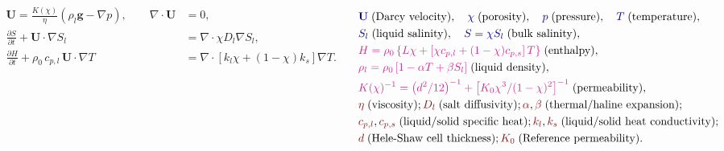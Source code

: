 \documentclass[landscape,24pt, a0paper,colspace=10mm,blockverticalspace=12mm]{tikzposter}
\newcommand{\varColor}[1]{\textcolor{dukeblue}{#1}}
\newcommand{\eqnColor}[1]{\textcolor{royalfuchsia}{#1}}
\newcommand{\paramColor}[1]{\textcolor{falured}{#1}}
\begin{document}
\begin{columns}
{\begin{minipage}[t]{0.49\linewidth}
\begin{align}
\mathbf{U} = \frac{K(\chi)}{\eta} \left( \rho_l \mathbf{g} - \nabla p \right), \quad \quad   \nabla \cdot \mathbf{U} &= 0,   \tag*{(1, 2)}\label{eq:mom-mass} \\
    \frac{\partial S}{\partial t} + \mathbf{U} \cdot \nabla S_l &= \nabla \cdot \chi D_l \nabla S_l, \label{eq:salt-cons} \tag*{(3)} \\
    \frac{\partial H}{\partial t} + \rho_0 \, c_{p,l} \, \mathbf{U} \cdot \nabla  T &= \nabla \cdot \left[ k_l \chi + (1-\chi) k_s \right] \nabla T . \label{eq:energy-cons} \tag*{(4)}
\end{align} 
\end{minipage}
\hfill
\begin{minipage}[t][][b]{0.48\linewidth}
\vspace{-1.75\baselineskip}
\begin{align*}
&\varColor{\mathbf{U}}\; \text{(Darcy velocity)}, \quad \varColor{\chi} \; \text{(porosity)}, \quad \varColor{p} \; \text{(pressure)}, \quad \varColor{T} \; \text{(temperature)},\\
&\varColor{S_l} \; \text{(liquid salinity)}, \quad \varColor{S = \chi S_l} \; \text{(bulk salinity)},  \\
&\eqnColor{H = \rho_0 \left\{ L \chi + \left[\chi c_{p,l} + (1-\chi) c_{p,s}\right] T \right\}} \; \text{(enthalpy)}, \\
&\eqnColor{\rho_l = \rho_0 \left[1 - \alpha T + \beta S_l \right]} \; \text{(liquid density)}, \\
&\eqnColor{K(\chi)^{-1} = \left(d^2/12\right)^{-1} + \left[K_0 \chi^3 / (1-\chi)^2 \right]^{-1}} \; \text{(permeability)}, \\
&\paramColor{\eta} \; \text{(viscosity)}; \paramColor{D_l} \; \text{(salt diffusivity)}; \paramColor{\alpha}, \paramColor{\beta} \; \text{(thermal/haline expansion)}; \\
&\paramColor{c_{p,l}}, \paramColor{c_{p,s}} \; \text{(liquid/solid specific heat)}; \paramColor{k_l}, \paramColor{k_s} \; \text{(liquid/solid heat conductivity)}; \\
&\paramColor{d} \; \text{(Hele-Shaw cell thickness)}; \paramColor{K_0} \; \text{(Reference permeability)}.
\end{align*}
\end{minipage}



}


{

}
\end{columns}
\end{document}

